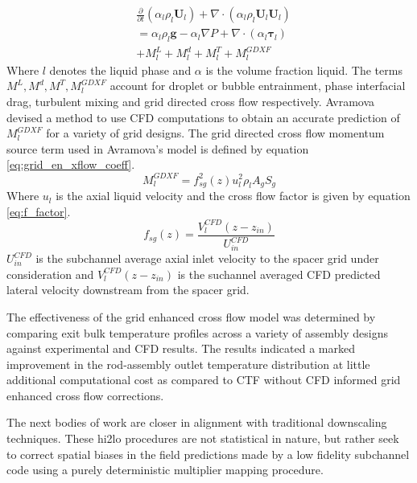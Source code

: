     	\begin{align}
    	& \frac{\partial }{\partial t}(\alpha_l \rho_l \mathbf U_l)
    	+ \nabla \cdot (\alpha_l \rho_l \mathbf U_l \mathbf U_l) \nonumber \\
    	&= \alpha_l \rho_l \mathbf{g} - \alpha_l \nabla P + 
    	\nabla \cdot (\alpha_l \bm{\tau}_l) \nonumber \\
    	&+ M^L_l + M^d_l + M^T_l + M_l^{GDXF}
        \label{eq:ctf_lat_mom}
    	\end{align}
Where $l$ denotes the liquid phase and $\alpha$ is the volume fraction liquid.  The terms $M^L, M^d, M^T, M_l^{GDXF}$ account for droplet or bubble entrainment, phase interfacial drag, turbulent mixing and grid directed cross flow respectively.  Avramova devised a method to use CFD computations to obtain an accurate prediction of $M_l^{GDXF}$ for a variety of grid designs.
The grid directed cross flow momentum source term used in Avramova's model is defined by equation \ref{eq:grid_en_xflow_coeff}.
    	\begin{equation}
    	M_l^{GDXF} = f^2_{sg}(z) u_l^2 \rho_l A_g S_g
        \label{eq:grid_en_xflow_coeff}
    	\end{equation}
        Where $u_l$ is the axial liquid velocity and the cross flow factor is given by equation \ref{eq:f_factor}.
    	\begin{equation}
    	f_{sg}(z) = \frac{V^{CFD}_l(z-z_{in})}{U^{CFD}_{in}}
        \label{eq:f_factor}
    	\end{equation}
        $U^{CFD}_{in}$ is the subchannel average axial inlet velocity to the spacer grid under consideration and $V^{CFD}_l(z-z_{in})$ is the suchannel averaged CFD predicted lateral velocity downstream from the spacer grid.

 The effectiveness of the grid enhanced cross flow model was determined by comparing exit bulk temperature profiles across a variety of assembly designs against experimental and CFD results.  The results indicated a marked improvement in the rod-assembly outlet temperature distribution at little additional computational cost as compared to CTF without CFD informed grid enhanced cross flow corrections.  
 
 The next bodies of work are closer in alignment with traditional downscaling techniques.  These hi2lo procedures are not statistical in nature, but rather seek to correct spatial biases in the field predictions made by a low fidelity subchannel code using a purely deterministic multiplier mapping procedure.
    
